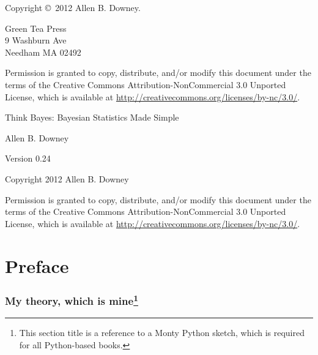 \documentclass[12pt]{book}
\newcommand{\thetitle}{Think Bayes: Bayesian Statistics Made Simple}
\newcommand{\theversion}{0.24}
\begin{document}
\begin{latexonly}
Copyright \copyright ~2012 Allen B. Downey.


\vspace{0.2in}

\begin{flushleft}
Green Tea Press       \\
9 Washburn Ave \\
Needham MA 02492
\end{flushleft}

Permission is granted to copy, distribute, and/or modify this document
under the terms of the Creative Commons Attribution-NonCommercial 3.0 Unported
License, which is available at \url{http://creativecommons.org/licenses/by-nc/3.0/}.

\vspace{0.2in}

\end{latexonly}



\begin{htmlonly}


{\Large \thetitle}

{\large Allen B. Downey}

Version \theversion

\vspace{0.25in}

Copyright 2012 Allen B. Downey

\vspace{0.25in}

Permission is granted to copy, distribute, and/or modify this document
under the terms of the Creative Commons Attribution-NonCommercial 3.0
Unported License, which is available at
\url{http://creativecommons.org/licenses/by-nc/3.0/}.

\setcounter{chapter}{-1}

\end{htmlonly}

\fi

\chapter{Preface}
\label{preface}

\subsection*{My theory, which is mine\footnote{This section title
is a reference to a Monty Python sketch, which is required for
all Python-based books.}}
\end{document}
